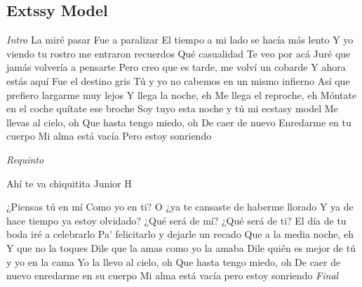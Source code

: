 \subsection{Extssy Model}
\noindent

\vspace{1cm}

\begin{guitar}
	\begin{multicols}{2}

		\textit{Intro}
	La miré pasar
	Fue a paralizar
	El tiempo a mi lado se hacía más lento
	Y yo viendo tu rostro me entraron recuerdos
	Qué casualidad
	Te veo por acá
	Juré que jamás volvería a pensarte
	Pero creo que es tarde, me volví un cobarde
	Y ahora estás aquí
	Fue el destino gris
	Tú y yo no cabemos en un mismo infierno
	Así que prefiero largarme muy lejos
	Y llega la noche, eh
	Me llega el reproche, eh
	Móntate en el coche quítate ese broche
	Soy tuyo esta noche y tú mi ecstasy model
	Me llevas al cielo, oh
	Que hasta tengo miedo, oh
	De caer de nuevo
	Enredarme en tu cuerpo
	Mi alma está vacía
	Pero estoy sonriendo
	\par
	\textit{Requinto}
	\par
	Ahí te va chiquitita
	Junior H
	\par
	¿Piensas tú en mí
	Como yo en ti?
	O ¿ya te cansaste de haberme llorado
	Y ya de hace tiempo ya estoy olvidado?
	¿Qué será de mí?
	¿Qué será de ti?
	El día de tu boda iré a celebrarlo
	Pa' felicitarlo y dejarle un recado
	Que a la media noche, eh
	Y que no la toques
	Dile que la amas como yo la amaba
	Dile quién es mejor de tú y yo en la cama
	Yo la llevo al cielo, oh
	Que hasta tengo miedo, oh
	De caer de nuevo enredarme en su cuerpo
	Mi alma está vacía pero estoy sonriendo
		\textit{Final}

	\end{multicols}
\end{guitar}
